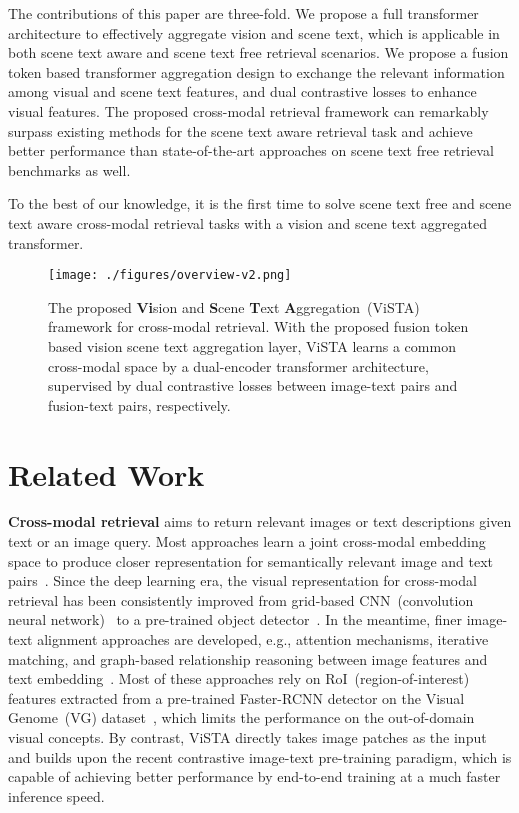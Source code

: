 \documentclass[10pt,twocolumn,letterpaper]{article}
\begin{document}
\vspace{-0.23em}
The contributions of this paper are three-fold.  We propose a full transformer architecture to effectively aggregate vision and scene text, which is applicable in both scene text aware and scene text free retrieval scenarios.  We propose a fusion token based transformer aggregation design to exchange the relevant information among visual and scene text features, and dual contrastive losses to enhance visual features.  The proposed cross-modal retrieval framework can remarkably surpass existing methods for the scene text aware retrieval task and achieve better performance than state-of-the-art approaches on scene text free retrieval benchmarks as well.

To the best of our knowledge, it is the first time to solve scene text free and scene text aware cross-modal retrieval tasks with a vision and scene text aggregated transformer.



\begin{figure*}[ht]
\begin{center}
   \texttt{[image: ./figures/overview-v2.png]}
\scriptsize   
    \end{center}\vspace{-2em}
\scriptsize
   \caption{The proposed \textbf{Vi}sion and \textbf{S}cene \textbf{T}ext \textbf{A}ggregation~(ViSTA) framework for cross-modal retrieval. With the proposed fusion token based vision scene text aggregation layer, ViSTA learns a common cross-modal space by a dual-encoder transformer architecture, supervised by dual contrastive losses between image-text pairs and fusion-text pairs, respectively.}
   \label{fig:framework}
\end{figure*}



\section{Related Work}
\noindent \textbf{Cross-modal retrieval}
aims to return relevant images or text descriptions given text or an image query. Most approaches learn a joint cross-modal embedding space to produce closer representation for semantically relevant image and text pairs~\cite{Skip-Gram, frome2013devise, faghri2017vse++}. Since the deep learning era, the visual representation for cross-modal retrieval has been consistently improved from grid-based CNN~(convolution neural network)~\cite{faghri2017vse++} to a pre-trained object detector~\cite{SCAN, VSRN}. In the meantime, finer image-text alignment approaches are developed, e.g., attention mechanisms, iterative matching, and graph-based relationship reasoning between image features and text embedding~\cite{SCAN, VSRN, IMRAM, GSMN, SGRAF}. Most of these approaches rely on RoI~(region-of-interest) features extracted from a pre-trained Faster-RCNN detector on the Visual Genome~(VG) dataset~\cite{VG_dataset}, which limits the performance on the out-of-domain visual concepts. By contrast, ViSTA directly takes image patches as the input and builds upon the recent contrastive image-text pre-training paradigm, which is capable of achieving better performance by end-to-end training at a much faster inference speed.
\end{document}
